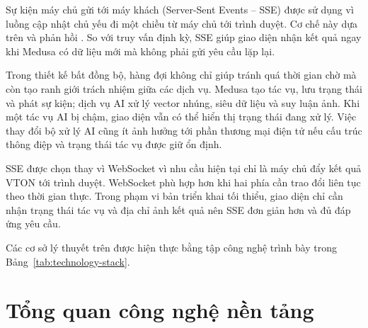 \medskip

Sự kiện máy chủ gửi tới máy khách (Server-Sent Events -- SSE) được sử dụng vì luồng cập nhật chủ yếu đi một chiều từ máy chủ tới trình duyệt. Cơ chế này dựa trên  và phản hồi  \cite{sse-mdn}. So với truy vấn định kỳ, SSE giúp giao diện nhận kết quả ngay khi Medusa có dữ liệu mới mà không phải gửi yêu cầu lặp lại.

\medskip

Trong thiết kế bất đồng bộ, hàng đợi không chỉ giúp tránh quá thời gian chờ mà còn tạo ranh giới trách nhiệm giữa các dịch vụ. Medusa tạo tác vụ, lưu trạng thái và phát sự kiện; dịch vụ AI xử lý vector nhúng, siêu dữ liệu và suy luận ảnh. Khi một tác vụ AI bị chậm, giao diện vẫn có thể hiển thị trạng thái đang xử lý. Việc thay đổi bộ xử lý AI cũng ít ảnh hưởng tới phần thương mại điện tử nếu cấu trúc thông điệp và trạng thái tác vụ được giữ ổn định.

\medskip

SSE được chọn thay vì WebSocket vì nhu cầu hiện tại chỉ là máy chủ đẩy kết quả VTON tới trình duyệt. WebSocket phù hợp hơn khi hai phía cần trao đổi liên tục theo thời gian thực. Trong phạm vi bản triển khai tối thiểu, giao diện chỉ cần nhận trạng thái tác vụ và địa chỉ ảnh kết quả nên SSE đơn giản hơn và đủ đáp ứng yêu cầu.

\medskip

Các cơ sở lý thuyết trên được hiện thực bằng tập công nghệ trình bày trong Bảng~\ref{tab:technology-stack}.

\section{Tổng quan công nghệ nền tảng}


